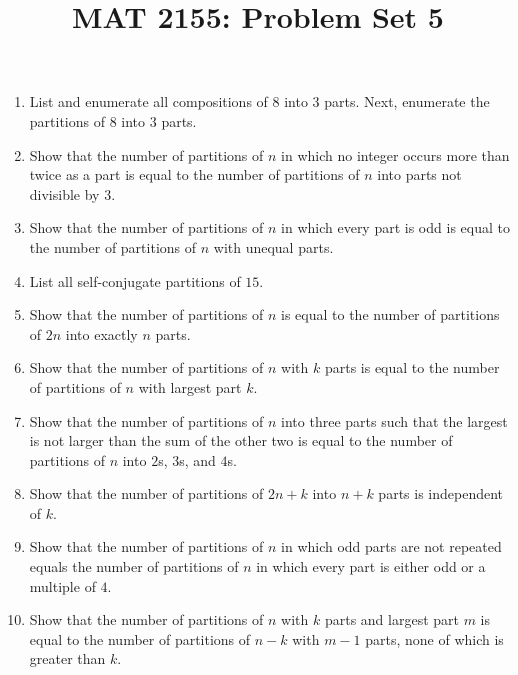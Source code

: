 \documentclass[svgnames]{amsart}
\title{MAT 2155: Problem Set 5}
\date{}
\begin{document}
\maketitle
\begin{enumerate}[leftmargin=*]
\item List and enumerate all compositions of $8$ into $3$ parts. Next, enumerate the partitions of $8$ into $3$ parts.

\item Show that the number of partitions of $n$ in which no integer occurs more than twice as a part is equal to the number of partitions of $n$ into parts not divisible by $3$.

\item Show that the number of partitions of $n$ in which every part is odd is equal to the number of partitions of $n$ with unequal parts.

\item List all self-conjugate partitions of $15$.

\item Show that the number of partitions of $n$ is equal to the number of partitions of $2n$ into exactly $n$ parts.

\item Show that the number of partitions of $n$ with $k$ parts is equal to the number of partitions of $n$ with largest part $k$.

\item Show that the number of partitions of $n$ into three parts such that the largest is not larger than the sum of the other two is equal to the number of partitions of $n$ into $2$s, $3$s, and $4$s.

\item Show that the number of partitions of $2n + k$ into $n + k$ parts is independent of $k$.

\item Show that the number of partitions of $n$ in which odd parts are not repeated equals the number of partitions of $n$ in which every part is either odd or a multiple of $4$.

\item Show that the number of partitions of $n$ with $k$ parts and largest part $m$ is equal to the number of partitions of $n - k$ with $m - 1$ parts, none of which is greater than $k$.

\end{enumerate}
\end{document}
